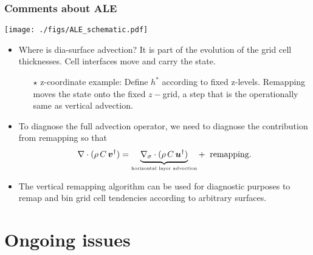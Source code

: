 \documentclass[10pt]{beamer}
\begin{document}
\begin{frame}
  \frametitle{Comments about ALE}

\begin{center}
{\texttt{[image: ./figs/ALE\_schematic.pdf]}}
\end{center}


\vspace{-.3cm} 
\begin{exampleblock}{}
\begin{itemize}


\item {\sc Where is dia-surface advection?}  It is part of the
  evolution of the grid cell thicknesses.  Cell interfaces move and
  carry the state.
   \begin{itemize}  \footnotesize 
   \item[$\star$] {\sc z-coordinate example:} Define $h^{*}$ according
     to fixed z-levels.  Remapping moves the state onto the fixed
     $z-$grid, a step that is the operationally same as vertical
     advection.
   \end{itemize}

 \item To diagnose the full advection operator, we need to diagnose
   the contribution from remapping so that
\begin{equation}
    \nabla \cdot (\rho \, C \, {\bm v}^{\dagger} ) = \underbrace{ \nabla_{\sigma} \cdot (\rho \, C \, {\bm u}^{\dagger} )}_{\mbox{\tiny horizontal layer advection}}
  + \; \; \mbox{remapping}.
\end{equation}


\item The vertical remapping algorithm can be used for diagnostic
  purposes to remap and bin grid cell tendencies according to
  arbitrary surfaces.

\end{itemize}
\end{exampleblock}{}

\end{frame}













\section{Ongoing issues}
\end{document}
